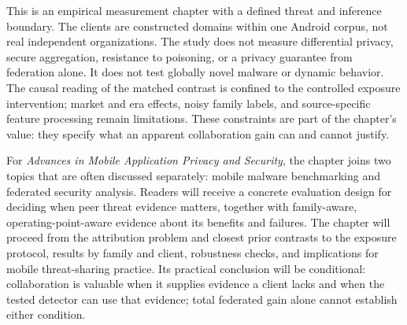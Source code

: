 \documentclass[11pt,a4paper]{article}
\begin{document}
This is an empirical measurement chapter with a defined threat and inference boundary. The clients are constructed domains within one Android corpus, not real independent organizations. The study does not measure differential privacy, secure aggregation, resistance to poisoning, or a privacy guarantee from federation alone. It does not test globally novel malware or dynamic behavior. The causal reading of the matched contrast is confined to the controlled exposure intervention; market and era effects, noisy family labels, and source-specific feature processing remain limitations. These constraints are part of the chapter's value: they specify what an apparent collaboration gain can and cannot justify.

For \emph{Advances in Mobile Application Privacy and Security}, the chapter joins two topics that are often discussed separately: mobile malware benchmarking and federated security analysis. Readers will receive a concrete evaluation design for deciding when peer threat evidence matters, together with family-aware, operating-point-aware evidence about its benefits and failures. The chapter will proceed from the attribution problem and closest prior contrasts to the exposure protocol, results by family and client, robustness checks, and implications for mobile threat-sharing practice. Its practical conclusion will be conditional: collaboration is valuable when it supplies evidence a client lacks and when the tested detector can use that evidence; total federated gain alone cannot establish either condition.
\end{document}
